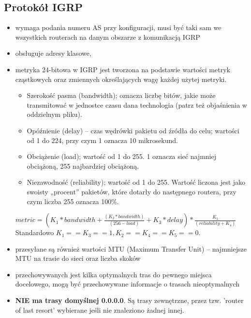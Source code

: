 \documentclass[../main.tex]{subfiles}
\begin{document}
    \subsection{Protokół IGRP}
    \begin{itemize}
        \item wymaga podania numeru AS przy konfiguracji, musi być taki sam
        we wszystkich routerach na danym obszarze z komunikacją IGRP
        \item obsługuje adresy klasowe,
        \item metryka 24-bitowa w IGRP jest tworzona na podstawie wartości metryk cząstkowych oraz zmiennych
        określających wagę każdej użytej metryki.
        \begin{itemize}
            \item Szerokość pasma (bandwidth); oznacza liczbę bitów, jakie może transmitować w
            jednostce czasu dana technologia (patrz też objaśnienia w oddzielnym pliku).
            \item Opóźnienie (delay) – czas wędrówki pakietu od źródła do celu; wartości od 1 do 224, przy
            czym 1 oznacza 10 mikrosekund.
            \item Obciążenie (load); wartość od 1 do 255. 1 oznacza sieć najmniej obciążoną, 255
            najbardziej obciążoną.
            \item Niezawodność (reliability); wartość od 1 do 255. Wartość liczona jest jako swoisty
            „procent” pakietów, które dotarły do następnego routera, przy czym liczba 255 oznacza
            100\%.
        \end{itemize}
        $metric = (K_1 * bandwidth + \frac{(K_2*bandwidth)}{(256 - load)} + K_3 * delay) *
        \frac{K_5}{(reliability + K_4)}$
        Standardowo $K_1 == K_3 == 1, K_2 == K_4 == K_5 == 0$.
        \item przesyłane są również wartości MTU (Maximum Transfer Unit) – najmniejsze MTU na trasie do sieci oraz liczba skoków
        \item przechowywanych jest kilka optymalnych tras do pewnego miejsca docelowego, mogą być przechowywane informacje o trasach nieoptymalnych
        \item \textbf{NIE ma trasy domyślnej 0.0.0.0}. Są trasy zewnętrzne, przez tzw. 'router of last resort'
        wybierane jeśli nie znaleziono żadnej innej.
    \end{itemize}
\end{document}
